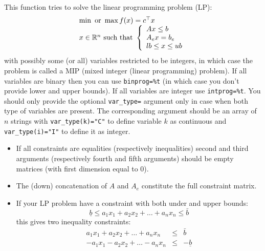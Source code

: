 \begin{mandescription}
This function tries to solve the linear programming problem (LP):
$$
\begin{array}{l}
\min \mbox{ or } \max f(x) = c^{\top} x\\
x \in \mathbb R^n \mbox{ such that } \left\{ \begin{array}{l} 
  A x \le b \\
  A_e x = b_e \\
  lb \le x \le ub 
\end{array}\right.
\end{array}
$$
with possibly some (or all) variables restricted to be integers, in which
case the problem is called a MIP (mixed integer (linear programming) problem).
If all variables are binary then you can use \verb+binprog=%t+ (in which case
you don't provide lower and upper bounds). If all variables are 
integer use \verb+intprog=%t+. You should only provide the optional
\verb+var_type=+ argument only in case when both type of variables are
present.  The corresponding argument should be an array of $n$ strings 
with \verb+var_type(k)="C"+ to define variable $k$ as continuous 
and \verb+var_type(i)="I"+  to define it as integer.

\begin{itemize}
\item If all constraints are equalities (respectively inequalities) second 
and third arguments (respectively fourth and fifth arguments) should 
be empty matrices (with first dimension equal to 0). 
\item The (down) concatenation of $A$ and $A_e$ constitute the full
constraint matrix.
\item If your LP problem have a constraint with both under and upper bounds:
$$
   \underline{b} \le a_1 x_1 + a_2 x_2 + \dots + a_n x_n \le \bar{b}
$$
this gives two inequality constraints:
$$
\begin{array}{rcl}
 a_1 x_1 + a_2 x_2 + \dots + a_n x_n  & \le & \bar{b}\\
 -a_1 x_1 - a_2 x_2 + \dots - a_n x_n &  \le & -\underline{b}
\end{array}
$$
\end{itemize}


\end{mandescription}
